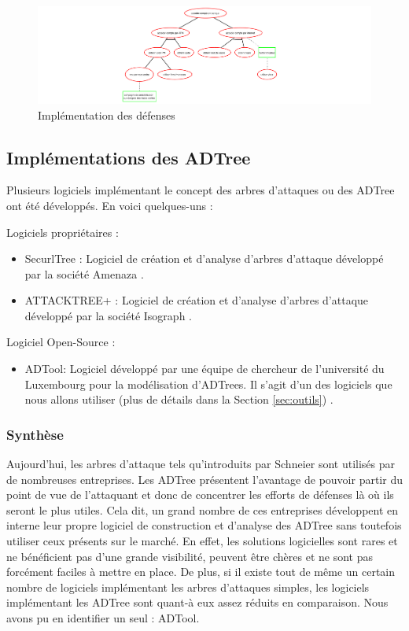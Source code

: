         \begin{figure}[htbp]
        \centering
        \includegraphics[width=\textwidth]{figure/exemple2_rapport.pdf}%
        \caption{Implémentation des défenses}
        \label{fig:arbre_exemple_3}
        \end{figure}

	\subsection{Implémentations des ADTree}
		Plusieurs logiciels implémentant le concept des arbres d'attaques ou des ADTree ont été développés. En voici quelques-uns :
        
        Logiciels propriétaires :
        \begin{itemize}
        \item SecurlTree : Logiciel de création et d'analyse d'arbres d'attaque développé par la société Amenaza \cite{SecurlTree}.
        \item ATTACKTREE+ : Logiciel de création et d'analyse d'arbres d'attaque développé par la société Isograph \cite{ATTACKTREE+}.
        \end{itemize}
        
        Logiciel Open-Source :
        \begin{itemize}
        \item ADTool: Logiciel développé par une équipe de chercheur de l'université du Luxembourg pour la modélisation d'ADTrees. Il s'agit d'un des logiciels que nous allons utiliser (plus de détails dans la Section \ref{sec:outils}) \cite{ADTool}.
        \end{itemize}

        \subsubsection{Synthèse}
            Aujourd'hui, les arbres d'attaque tels qu'introduits par Schneier sont utilisés par de nombreuses entreprises. Les ADTree présentent l'avantage de pouvoir partir du point de vue de l'attaquant et donc de concentrer les efforts de défenses là où ils seront le plus utiles. Cela dit, un grand nombre de ces entreprises développent en interne leur propre logiciel de construction et d'analyse des ADTree sans toutefois utiliser ceux présents sur le marché. En effet, les solutions logicielles sont rares et ne bénéficient pas d'une grande visibilité, peuvent être chères et ne sont pas forcément faciles à mettre en place. De plus, si il existe tout de même un certain nombre de logiciels implémentant les arbres d'attaques simples, les logiciels implémentant les ADTree sont quant-à eux assez réduits en comparaison. Nous avons pu en identifier un seul : ADTool. 

